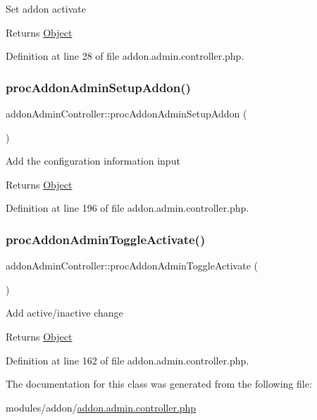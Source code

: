 Set addon activate

\begin{DoxyReturn}{Returns}
\hyperlink{classObject}{Object} 
\end{DoxyReturn}


Definition at line 28 of file addon.\+admin.\+controller.\+php.

\mbox{\label{classaddonAdminController_a43db10c21a41c0ebbeb13257d9bf86ea}} 
\subsubsection{\texorpdfstring{proc\+Addon\+Admin\+Setup\+Addon()}{procAddonAdminSetupAddon()}}
{\footnotesize\ttfamily addon\+Admin\+Controller\+::proc\+Addon\+Admin\+Setup\+Addon (\begin{DoxyParamCaption}{ }\end{DoxyParamCaption})}

Add the configuration information input

\begin{DoxyReturn}{Returns}
\hyperlink{classObject}{Object} 
\end{DoxyReturn}


Definition at line 196 of file addon.\+admin.\+controller.\+php.

\mbox{\label{classaddonAdminController_a97250cb7cb4dc0b78789b8a9186d94d4}} 
\subsubsection{\texorpdfstring{proc\+Addon\+Admin\+Toggle\+Activate()}{procAddonAdminToggleActivate()}}
{\footnotesize\ttfamily addon\+Admin\+Controller\+::proc\+Addon\+Admin\+Toggle\+Activate (\begin{DoxyParamCaption}{ }\end{DoxyParamCaption})}

Add active/inactive change

\begin{DoxyReturn}{Returns}
\hyperlink{classObject}{Object} 
\end{DoxyReturn}


Definition at line 162 of file addon.\+admin.\+controller.\+php.



The documentation for this class was generated from the following file\+:\begin{DoxyCompactItemize}
\item 
modules/addon/\hyperlink{addon_8admin_8controller_8php}{addon.\+admin.\+controller.\+php}\end{DoxyCompactItemize}
